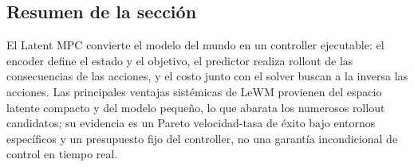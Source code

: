 \subsection{Resumen de la sección}

El Latent MPC convierte el modelo del mundo en un controller ejecutable: el encoder define el estado y el objetivo, el predictor realiza rollout de las consecuencias de las acciones, y el costo junto con el solver buscan a la inversa las acciones. Las principales ventajas sistémicas de LeWM provienen del espacio latente compacto y del modelo pequeño, lo que abarata los numerosos rollout candidatos; su evidencia es un Pareto velocidad-tasa de éxito bajo entornos específicos y un presupuesto fijo del controller, no una garantía incondicional de control en tiempo real.


